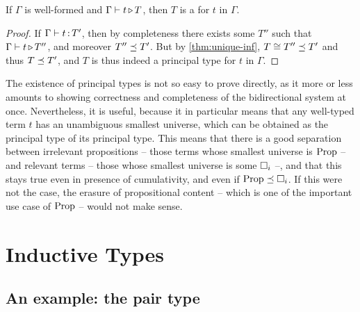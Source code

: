 \begin{theorem}
  \label{thm:princ-types}
  If $\Gamma$ is well-formed and $\Gamma \vdash t \operatorname{\triangleright} T$,
  then $T$ is a  for $t$ in $\Gamma$.
\end{theorem}
  
\begin{proof}
  If $\Gamma \vdash t \operatorname{:} T'$, then by completeness there exists some $T''$ such that
  $\Gamma \vdash t \operatorname{\triangleright} T''$, and moreover $T'' \preceq T'$.
  But by \cref{thm:unique-inf}, $T \cong T'' \preceq T'$ and thus $T \preceq T'$, and $T$ is thus indeed a principal type for $t$ in $\Gamma$.
\end{proof}

The existence of principal types is not so easy to prove directly, as it more or less
amounts to showing correctness and completeness of the bidirectional system at once.
Nevertheless, it is useful, because it in particular means that any well-typed term $t$
has an unambiguous smallest universe, which can be obtained as the principal
type of its principal type. This means that there is a good separation between irrelevant 
propositions – those terms whose smallest universe is $\operatorname{Prop}$ – and relevant terms
– those whose smallest universe is some $\uni[i]$ –, and that this stays true even in
presence of cumulativity, and even if $\Prop \cum \uni[i]$. If this were not the case,
the erasure of propositional content – which is one of the important use case of $\operatorname{Prop}$ –
would not make sense.

\section{Inductive Types}
\label{sec:bidir-pcuic-inductives}

\subsection{An example: the pair type}

